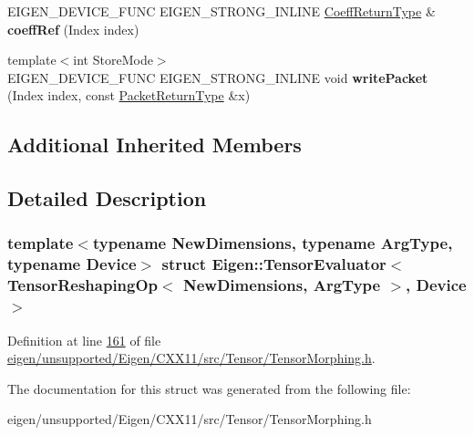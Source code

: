 \begin{DoxyCompactItemize}
\item 
\mbox{\label{struct_eigen_1_1_tensor_evaluator_3_01_tensor_reshaping_op_3_01_new_dimensions_00_01_arg_type_01_4_00_01_device_01_4_a9106547d9070fac1db8f42a9f06de323}} 
E\+I\+G\+E\+N\+\_\+\+D\+E\+V\+I\+C\+E\+\_\+\+F\+U\+NC E\+I\+G\+E\+N\+\_\+\+S\+T\+R\+O\+N\+G\+\_\+\+I\+N\+L\+I\+NE \hyperlink{group___sparse_core___module}{Coeff\+Return\+Type} \& {\bfseries coeff\+Ref} (Index index)
\item 
\mbox{\label{struct_eigen_1_1_tensor_evaluator_3_01_tensor_reshaping_op_3_01_new_dimensions_00_01_arg_type_01_4_00_01_device_01_4_a1e619f18e6f6c3a74db01c0e615f4b02}} 
{\footnotesize template$<$int Store\+Mode$>$ }\\E\+I\+G\+E\+N\+\_\+\+D\+E\+V\+I\+C\+E\+\_\+\+F\+U\+NC E\+I\+G\+E\+N\+\_\+\+S\+T\+R\+O\+N\+G\+\_\+\+I\+N\+L\+I\+NE void {\bfseries write\+Packet} (Index index, const \hyperlink{group___sparse_core___module}{Packet\+Return\+Type} \&x)
\end{DoxyCompactItemize}
\subsection*{Additional Inherited Members}


\subsection{Detailed Description}
\subsubsection*{template$<$typename New\+Dimensions, typename Arg\+Type, typename Device$>$\newline
struct Eigen\+::\+Tensor\+Evaluator$<$ Tensor\+Reshaping\+Op$<$ New\+Dimensions, Arg\+Type $>$, Device $>$}



Definition at line \hyperlink{eigen_2unsupported_2_eigen_2_c_x_x11_2src_2_tensor_2_tensor_morphing_8h_source_l00161}{161} of file \hyperlink{eigen_2unsupported_2_eigen_2_c_x_x11_2src_2_tensor_2_tensor_morphing_8h_source}{eigen/unsupported/\+Eigen/\+C\+X\+X11/src/\+Tensor/\+Tensor\+Morphing.\+h}.



The documentation for this struct was generated from the following file\+:\begin{DoxyCompactItemize}
\item 
eigen/unsupported/\+Eigen/\+C\+X\+X11/src/\+Tensor/\+Tensor\+Morphing.\+h\end{DoxyCompactItemize}
